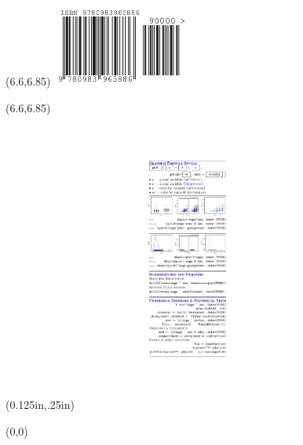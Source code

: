 \documentclass{article}
\newcommand{\trim}{0.125in}
\begin{document}
\begin{textblock}{1.65}(6.6,6.85)   %
\noindent\includegraphics[width=1.75in]{../../CoverImages/ISBN-8-6.png}
\end{textblock}
\begin{textblock}{1.65}(6.6,6.85)
\noindent{}
\end{textblock}



\begin{textblock*}{3}(\trim,.25in)
\noindent\includegraphics[width=2.9in]{backflap.pdf}
\end{textblock*}

\begin{textblock}{3}(0,0)
\noindent{}
\end{textblock}

\end{document}
